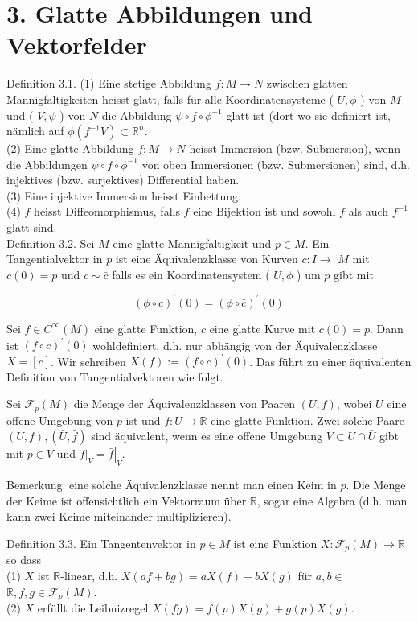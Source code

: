 \documentclass[10pt]{article}
\begin{document}
\section*{3. Glatte Abbildungen und Vektorfelder}
Definition 3.1. (1) Eine stetige Abbildung $f: M \rightarrow N$ zwischen glatten Mannigfaltigkeiten heisst glatt, falls für alle Koordinatensysteme ( $U, \phi$ ) von $M$ und ( $V, \psi$ ) von $N$ die Abbildung $\psi \circ f \circ \phi^{-1}$ glatt ist (dort wo sie definiert ist, nämlich auf $\phi\left(f^{-1} V\right) \subset \mathbb{R}^{n}$.\\
(2) Eine glatte Abbildung $f: M \rightarrow N$ heisst Immersion (bzw. Submersion), wenn die Abbildungen $\psi \circ f \circ \phi^{-1}$ von oben Immersionen (bzw. Submersionen) sind, d.h. injektives (bzw. surjektives) Differential haben.\\
(3) Eine injektive Immersion heisst Einbettung.\\
(4) $f$ heisst Diffeomorphismus, falls $f$ eine Bijektion ist und sowohl $f$ als auch $f^{-1}$ glatt sind.\\
Definition 3.2. Sei $M$ eine glatte Mannigfaltigkeit und $p \in M$. Ein Tangentialvektor in $p$ ist eine Äquivalenzklasse von Kurven $c: I \rightarrow$ $M$ mit $c(0)=p$ und $c \sim \bar{c}$ falls es ein Koordinatensystem ( $U, \phi$ ) um $p$ gibt mit

$$
(\phi \circ c)^{\prime}(0)=(\phi \circ \bar{c})^{\prime}(0)
$$

Sei $f \in C^{\infty}(M)$ eine glatte Funktion, $c$ eine glatte Kurve mit $c(0)=p$. Dann ist $(f \circ c)^{\prime}(0)$ wohldefiniert, d.h. nur abhängig von der Äquivalenzklasse $X=[c]$. Wir schreiben $X(f):=(f \circ c)^{\prime}(0)$. Das führt zu einer äquivalenten Definition von Tangentialvektoren wie folgt.

Sei $\mathcal{F}_{p}(M)$ die Menge der Äquivalenzklassen von Paaren $(U, f)$, wobei $U$ eine offene Umgebung von $p$ ist und $f: U \rightarrow \mathbb{R}$ eine glatte Funktion. Zwei solche Paare $(U, f),(\bar{U}, \bar{f})$ sind äquivalent, wenn es eine offene Umgebung $V \subset U \cap \bar{U}$ gibt mit $p \in V$ und $\left.f\right|_{V}=\left.\bar{f}\right|_{V}$.

Bemerkung: eine solche Äquivalenzklasse nennt man einen Keim in $p$. Die Menge der Keime ist offensichtlich ein Vektorraum über $\mathbb{R}$, sogar eine Algebra (d.h. man kann zwei Keime miteinander multiplizieren).

Definition 3.3. Ein Tangentenvektor in $p \in M$ ist eine Funktion $X: \mathcal{F}_{p}(M) \rightarrow \mathbb{R}$ so dass\\
(1) $X$ ist $\mathbb{R}$-linear, d.h. $X(a f+b g)=a X(f)+b X(g)$ für $a, b \in$ $\mathbb{R}, f, g \in \mathcal{F}_{p}(M)$.\\
(2) $X$ erfüllt die Leibnizregel $X(f g)=f(p) X(g)+g(p) X(g)$.
\end{document}
